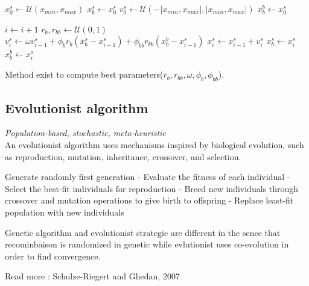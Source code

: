\documentclass[twocolumn]{article}
\numberwithin{equation}{section}
\begin{document}
\begin{framed}\begin{algorithmic}
	\State $x_0^s \gets \mathcal{U}(x_{min}, x_{max})$ 
	\State $x_{b}^s \gets x_0^s$ 
	\State $v_0^s \gets \mathcal{U}(-|x_{min}, x_{max}|, |x_{min}, x_{max}|)$ 
    	\State $x_b^b \gets x_0^s $
    \EndIf
\EndFor

\State $i \gets i+1$
	\State $r_b, r_{bb} \gets \mathcal{U}(0,1)$
	\State $v_i^s \gets \omega v_{i-1}^s + \phi_b r_b (x_b^s - x_{i-1}^s) + \phi_{bb} r_{bb} (x_b^b - x_{i-1}^s)$ 
	\State $x_i^s \gets x_{i-1}^s + v_i^s$ 
    	\State $x_{b}^s \gets x_i^s$
    		\State $x_{b}^b \gets x_i^s$
    	\EndIf
    \EndIf
\EndFor
\EndWhile
\end{algorithmic}\end{framed}

Method exist to compute best parameters($r_{b},r_{bb},\omega, \phi_b, \phi_{bb}$).
	\subsection{Evolutionist algorithm}
\emph{Population-based, stochastic, meta-heuristic}\\
An evolutionist algorithm uses mechanisms inspired by biological evolution, such as reproduction, mutation, inheritance, crossover, and selection.
\begin{framed}\begin{algorithmic}
\State Generate randomly first generation 
	\State - Evaluate the fitness of each individual
	\State - Select the best-fit individuals for reproduction
	\State - Breed new individuals through crossover and mutation operations to give birth to offspring
	\State - Replace least-fit population with new individuals
\EndWhile
\end{algorithmic}\end{framed}
Genetic algorithm and evolutionist strategie are different in the sence that recominbaison is randomized in genetic while evlutionist uses co-evolution in order to find convergence.


Read more : Schulze-Riegert and Ghedan, 2007
\end{document}
